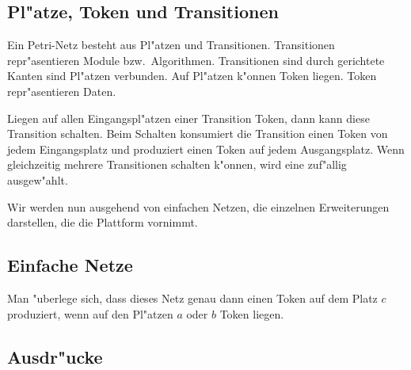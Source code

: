\documentclass[a4paper,12pt]{article}
\newlength{\st}\setlength{\st}{0pt}
\begin{document}
\subsection{Pl"atze, Token und Transitionen}

Ein Petri-Netz besteht aus Pl"atzen und Transitionen. Transitionen
repr"asentieren Module bzw.\ Algorithmen. Transitionen sind durch
gerichtete Kanten sind Pl"atzen verbunden. Auf Pl"atzen k"onnen Token
liegen. Token repr"asentieren Daten.

Liegen auf allen Eingangspl"atzen einer Transition Token, dann kann
diese Transition schalten. Beim Schalten konsumiert die Transition
einen Token von jedem Eingangsplatz und produziert einen Token auf
jedem Ausgangsplatz. Wenn gleichzeitig mehrere Transitionen schalten
k"onnen, wird eine zuf"allig ausgew"ahlt.

Wir werden nun ausgehend von einfachen Netzen, die einzelnen
Erweiterungen darstellen, die die Plattform vornimmt.

\subsection{Einfache Netze}

\begin{center}
\end{center}

Man "uberlege sich, dass dieses Netz genau dann einen Token auf dem
Platz $c$ produziert, wenn auf den Pl"atzen $a$ oder $b$ Token liegen.

\subsection{Ausdr"ucke}
\end{document}
